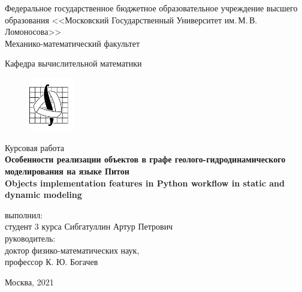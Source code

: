 \begin{titlepage}
	\begin{center}
		Федеральное государственное бюджетное образовательное учреждение высшего образования 
		<<Московский Государственный Университет им.\,М.\,В.\,Ломоносова>>\\
		
		Механико-математический факультет
		
		Кафедра вычислительной математики\\[0.6cm]
		
		\begin{figure}[!htp]
			\begin{center}
				{\includegraphics[width=20mm]{pics/mmlogo.png}}
			\end{center}
		\end{figure}
		
		Курсовая работа \\[0.6cm]
		
		{\bf Особенности реализации объектов в графе геолого-гидродинамического моделирования на языке Питон \\[0.5cm]}
		{\bf Objects implementation features in Python workflow in static and dynamic modeling \\[0.5cm]}
		
		\vspace{1.5cm}
		\begin{flushright}
			{ выполнил:}\\
			студент 3 курса Сибгатуллин Артур Петрович\\[0.5cm]
			{ руководитель:}\\
			доктор физико-математических наук,\\
			профессор К. Ю. Богачев\\
		\end{flushright}
		\vspace{1cm}
		
		\normalsize Москва, 2021
	\end{center}
\end{titlepage}
